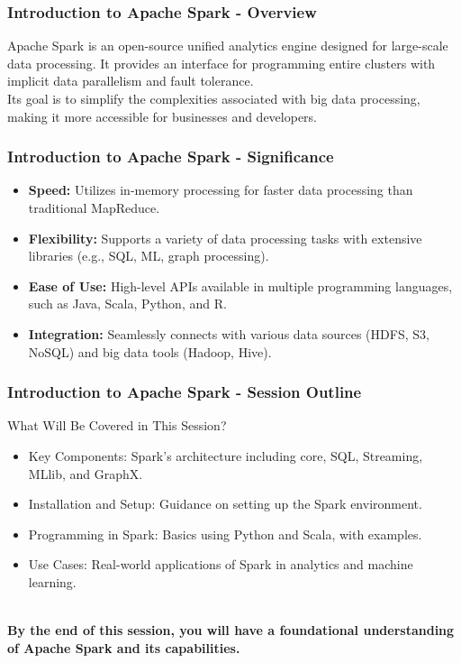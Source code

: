 \documentclass[aspectratio=169]{beamer}
\begin{document}
\frame{\titlepage}

\begin{frame}[fragile]
    \frametitle{Introduction to Apache Spark - Overview}
    Apache Spark is an open-source unified analytics engine designed for large-scale data processing. 
    It provides an interface for programming entire clusters with implicit data parallelism and fault tolerance.
    \\[1em]
    Its goal is to simplify the complexities associated with big data processing, making it more accessible for businesses and developers.
\end{frame}

\begin{frame}[fragile]
    \frametitle{Introduction to Apache Spark - Significance}
    \begin{itemize}
        \item \textbf{Speed:} Utilizes in-memory processing for faster data processing than traditional MapReduce.
        \item \textbf{Flexibility:} Supports a variety of data processing tasks with extensive libraries (e.g., SQL, ML, graph processing).
        \item \textbf{Ease of Use:} High-level APIs available in multiple programming languages, such as Java, Scala, Python, and R.
        \item \textbf{Integration:} Seamlessly connects with various data sources (HDFS, S3, NoSQL) and big data tools (Hadoop, Hive).
    \end{itemize}
\end{frame}

\begin{frame}[fragile]
    \frametitle{Introduction to Apache Spark - Session Outline}
    \begin{block}{What Will Be Covered in This Session?}
        \begin{itemize}
            \item Key Components: Spark's architecture including core, SQL, Streaming, MLlib, and GraphX.
            \item Installation and Setup: Guidance on setting up the Spark environment.
            \item Programming in Spark: Basics using Python and Scala, with examples.
            \item Use Cases: Real-world applications of Spark in analytics and machine learning.
        \end{itemize}
    \end{block}
    \\[1em]
    \textbf{By the end of this session, you will have a foundational understanding of Apache Spark and its capabilities.}
\end{frame}
\end{document}

